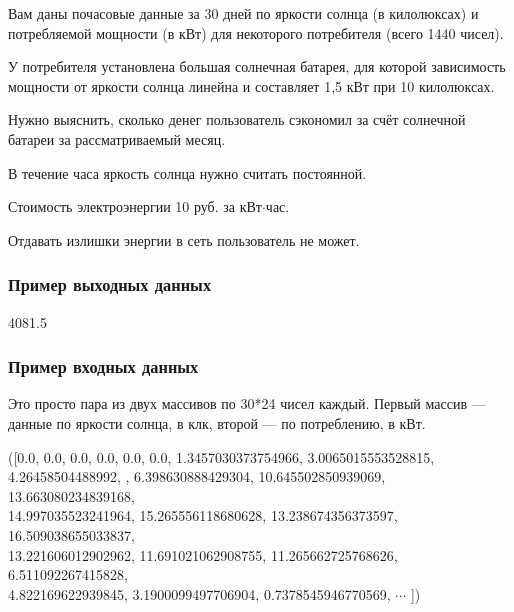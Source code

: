 
Вам даны почасовые данные за 30 дней по яркости солнца (в килолюксах) и потребляемой мощности (в кВт) для некоторого потребителя (всего 1440 чисел).

У потребителя установлена большая солнечная батарея, для которой зависимость мощности от яркости солнца линейна и составляет 1,5 кВт при 10 килолюксах.

Нужно выяснить, сколько денег пользователь сэкономил за счёт солнечной батареи за рассматриваемый месяц.

В течение часа яркость солнца нужно считать постоянной.

Стоимость электроэнергии 10 руб. за кВт$\cdot$час.

Отдавать излишки энергии в сеть пользователь не может.

\subsubsection*{Пример выходных данных}

4081.5

\subsubsection*{Пример входных данных}
Это просто пара из двух массивов по 30*24 чисел каждый. Первый массив — данные по яркости солнца, в клк, второй — по потреблению, в кВт.

\noindent([0.0, 0.0, 0.0, 0.0, 0.0, 0.0, 1.3457030373754966, 3.0065015553528815, 4.26458504488992, , 6.398630888429304, 10.645502850939069, 13.663080234839168, \\
14.997035523241964, 15.265556118680628, 13.238674356373597, 16.509038655033837, \\
13.221606012902962, 11.691021062908755, 11.265662725768626, 6.511092267415828, \\
4.822169622939845, 3.1900099497706904, 0.7378545946770569, $\cdots$ ])

